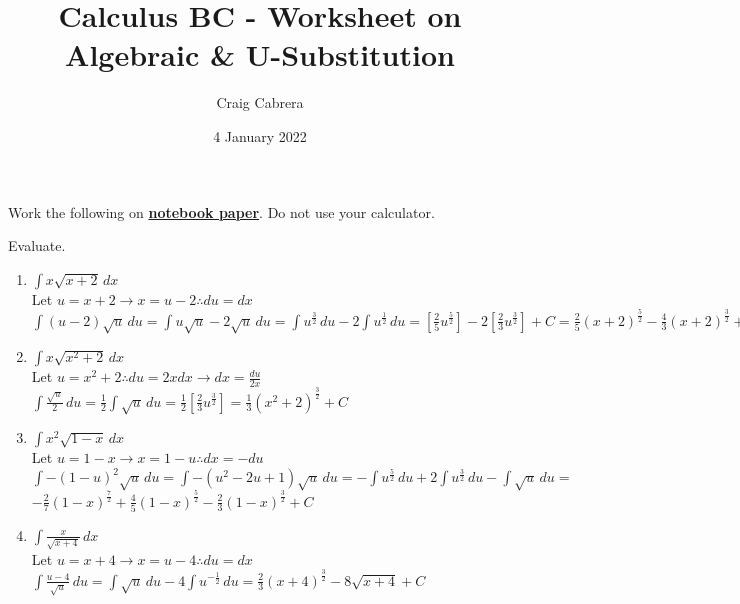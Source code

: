 \documentclass[10pt, letterpaper]{report}
\title{Calculus BC - Worksheet on Algebraic \& U-Substitution}
\author{Craig Cabrera}
\date{4 January 2022}
\begin{document}
\maketitle
Work the following on \textbf{\underline{notebook paper}}. Do not use your calculator.

Evaluate.
\begin{enumerate}
  \item{$\int{x\sqrt{x+2}}\,dx$} \\

    Let $u=x+2\rightarrow x=u-2 \therefore du=dx$ \\

    $\int (u-2)\sqrt{u}\,du=
    \int u\sqrt{u}-2\sqrt{u}\,du=
    \int u^{\frac{3}{2}}\,du-2\int u^{\frac{1}{2}}\,du=
    [\frac{2}{5}u^{\frac{5}{2}}]-2[\frac{2}{3}u^{\frac{3}{2}}]+C=
    \frac{2}{5}(x+2)^{\frac{5}{2}}-\frac{4}{3}(x+2)^{\frac{3}{2}}+C$ \\

  \item{$\int{x\sqrt{x^{2}+2}}\,dx$} \\

    Let $u=x^{2}+2\therefore du=2xdx\rightarrow dx=\frac{du}{2x}$ \\

    $\int{\frac{\sqrt{u}}{2}}\,du=
    \frac{1}{2}\int{\sqrt{u}}\,du=
    \frac{1}{2}[\frac{2}{3}u^{\frac{3}{2}}]=
    \frac{1}{3}(x^{2}+2)^{\frac{3}{2}}+C$ \\

  \item{$\int{x^{2}\sqrt{1-x}}\,dx$} \\

    Let $u=1-x\rightarrow x=1-u\therefore dx=-du$ \\

    $\int{-(1-u)^{2}\sqrt{u}}\,du=
    \int{-(u^{2}-2u+1)\sqrt{u}}\,du=
    -\int{u^{\frac{5}{2}}}\,du+2\int{u^{\frac{3}{2}}}\,du-\int{\sqrt{u}}\,du=$ \\
    $-\frac{2}{7}(1-x)^{\frac{7}{2}}+\frac{4}{5}(1-x)^{\frac{5}{2}}-\frac{2}{3}(1-x)^{\frac{3}{2}}+C$ \\

  \item{$\int{\frac{x}{\sqrt{x+4}}}\,dx$} \\

    Let $u=x+4\rightarrow x=u-4\therefore du=dx$ \\

    $\int{\frac{u-4}{\sqrt{u}}}\,du=
    \int{\sqrt{u}}\,du-4\int{u^{-\frac{1}{2}}}\,du=
    \frac{2}{3}(x+4)^{\frac{3}{2}}-8\sqrt{x+4}+C$ \\


\end{enumerate}
\end{document}
